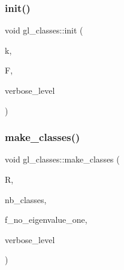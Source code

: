 \subsubsection{\texorpdfstring{init()}{init()}}
{\footnotesize\ttfamily void gl\+\_\+classes\+::init (\begin{DoxyParamCaption}\item[{\mbox{\hyperlink{galois_8h_a09fddde158a3a20bd2dcadb609de11dc}{I\+NT}}}]{k,  }\item[{\mbox{\hyperlink{classfinite__field}{finite\+\_\+field}} $\ast$}]{F,  }\item[{\mbox{\hyperlink{galois_8h_a09fddde158a3a20bd2dcadb609de11dc}{I\+NT}}}]{verbose\+\_\+level }\end{DoxyParamCaption})}

\mbox{\label{classgl__classes_a83c74f8c2c04e81ccd73d47c7ae8d3ab}} 
\subsubsection{\texorpdfstring{make\+\_\+classes()}{make\_classes()}}
{\footnotesize\ttfamily void gl\+\_\+classes\+::make\+\_\+classes (\begin{DoxyParamCaption}\item[{\mbox{\hyperlink{classgl__class__rep}{gl\+\_\+class\+\_\+rep}} $\ast$\&}]{R,  }\item[{\mbox{\hyperlink{galois_8h_a09fddde158a3a20bd2dcadb609de11dc}{I\+NT}} \&}]{nb\+\_\+classes,  }\item[{\mbox{\hyperlink{galois_8h_a09fddde158a3a20bd2dcadb609de11dc}{I\+NT}}}]{f\+\_\+no\+\_\+eigenvalue\+\_\+one,  }\item[{\mbox{\hyperlink{galois_8h_a09fddde158a3a20bd2dcadb609de11dc}{I\+NT}}}]{verbose\+\_\+level }\end{DoxyParamCaption})}

\mbox{\label{classgl__classes_a55857125690ee0ba217fbd54f0aaa341}} 
